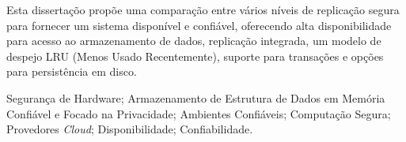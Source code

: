 Esta disserta\c{c}\~{o}o prop\~{o}e uma compara\c{c}\~{a}o entre v\'{a}rios n\'{i}veis de replica\c{c}\~{a}o segura para fornecer um sistema dispon\'{i}vel e confi\'{a}vel, oferecendo alta disponibilidade para acesso ao armazenamento de dados, replica\c{c}\~{a}o integrada, um modelo de despejo LRU (Menos Usado Recentemente), suporte para transa\c{c}\~{o}es e op\c{c}\~{o}es para persistência em disco.

\begin{keywords}
Seguran\c{c}a de Hardware; Armazenamento de Estrutura de Dados em Mem\'{o}ria Confi\'{a}vel e Focado na Privacidade; Ambientes Confi\'{a}veis; Computa\c{c}\~{a}o Segura; Provedores \textit{Cloud}; Disponibilidade; Confiabilidade.
\end{keywords} 
